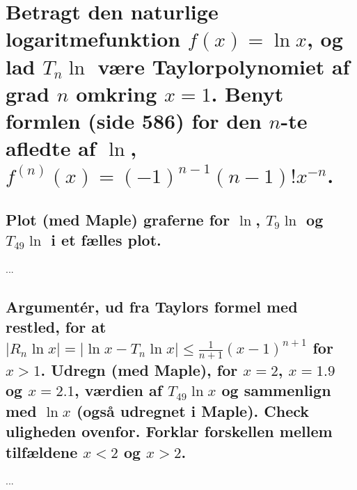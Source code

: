 \documentclass[11pt,a4paper]{article}
\newcommand{\modulus}[1]{\lvert#1\rvert}
\begin{document}
\section
{
    \mdseries
    Betragt den naturlige logaritmefunktion $f(x) = \ln x$, og lad $T_n \ln$
    være Taylorpolynomiet af grad $n$ omkring $x = 1$. Benyt formlen (side
    586) for den $n$-te afledte af $\ln$, $f^{(n)}(x) = (-1)^{n - 1}
    (n - 1)!x^{-n}$.
}

\subsection
{
    \mdseries
    Plot (med Maple) graferne for $\ln$, $T_9 \ln$ og $T_{49} \ln$ i et
    fælles plot.
}
...

\subsection
{
    \mdseries
    Argumentér, ud fra Taylors formel med restled, for at $\modulus{R_n
    \ln x} = \modulus{\ln x - T_n \ln x} \leq \frac{1}{n+1}(x-1)^{n+1}$ for
    $x > 1$. Udregn (med Maple), for $x = 2$, $x = 1.9$ og $x = 2.1$, værdien
    af $T_{49} \ln x$ og sammenlign med $\ln x$ (også udregnet i Maple).
    Check uligheden ovenfor. Forklar forskellen mellem tilfældene $x < 2$ og
    $x > 2$.
}
...
\end{document}
